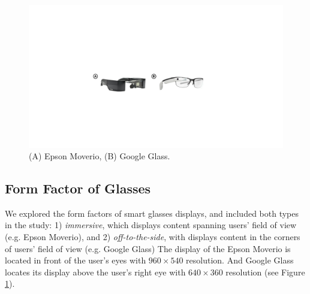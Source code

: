 \documentclass{sigchi}
\begin{document}
    \begin{figure}[!h]
  \centering
  \includegraphics[width=1\columnwidth]{Glasses.pdf}
  \caption{(A) Epson Moverio, (B) Google Glass.}
  \label{fig:Glasses}
  \end{figure}

\subsection {Form Factor of Glasses}
We explored the form factors of smart glasses displays, and included both types in the study: 1) \emph{immersive}, which displays content spanning users' field of view (e.g. Epson Moverio), and 2) \emph{off-to-the-side}, with displays content in the corners of users' field of view (e.g. Google Glass)
The display of the Epson Moverio is located in front of the user's eyes with $960 \times 540$ resolution\cite{BT100}. And Google Glass locates its display above the user's right eye with $640 \times 360$ resolution\cite{GoogleGlass} (see Figure \ref{fig:Glasses}). 

  
\end{document}
